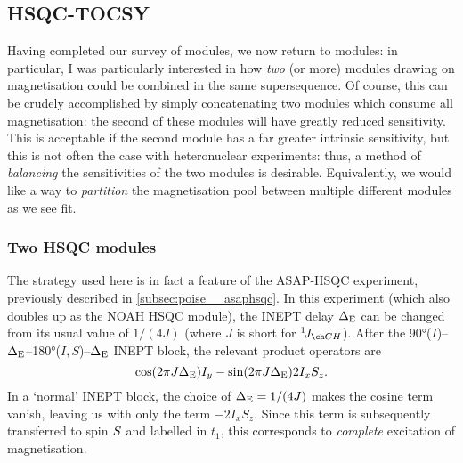 \subsection{HSQC-TOCSY}
\label{subsec:noah__hsqctocsy}

Having completed our survey of \nitrogen{} modules, we now return to \carbon{} modules: in particular, I was particularly interested in how \textit{two} (or more) modules drawing on  magnetisation could be combined in the same supersequence.
Of course, this can be crudely accomplished by simply concatenating two modules which consume all  magnetisation: the second of these modules will have greatly reduced sensitivity.
This is acceptable if the second module has a far greater intrinsic sensitivity, but this is not often the case with heteronuclear experiments: thus, a method of \textit{balancing} the sensitivities of the two modules is desirable.
Equivalently, we would like a way to \textit{partition} the magnetisation pool between multiple different modules as we see fit.


\subsubsection{Two HSQC modules}

The strategy used here is in fact a feature of the ASAP-HSQC experiment\autocite{SchulzeSunninghausen2014JACS,SchulzeSunninghausen2017JMR}, previously described in \cref{subsec:poise__asaphsqc}.
In this experiment (which also doubles up as the NOAH HSQC module), the INEPT delay $\Delta_{\text{E}}$ can be changed from its usual value of $1 / (4J)$ (where $J$ is short for $\oneJ{CH}$).
After the \ang{90}($I$)--$\Delta_{\text{E}}$--\ang{180}($I,S$)--$\Delta_{\text{E}}$ INEPT block, the relevant product operators are
\begin{equation}
    \label{eq:inept_changed}
    \cos(2\pi J\Delta_{\text{E}}) I_y - \sin(2\pi J\Delta_{\text{E}}) 2I_xS_z.
\end{equation}
In a `normal' INEPT block, the choice of $\Delta_{\text{E}} = 1/(4J)$ makes the cosine term vanish, leaving us with only the term $-2I_xS_z$.
Since this term is subsequently transferred to spin $S\/$ and labelled in $t_1$, this corresponds to \textit{complete} excitation of  magnetisation.

